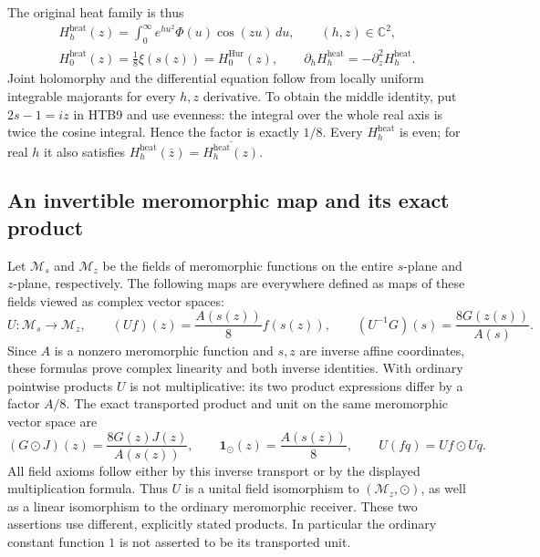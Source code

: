 \documentclass[11pt]{article}
\theoremstyle{definition}
\begin{document}
The original heat family is thus
\begin{equation}\tag{HTB10}
\begin{gathered}
 H_h^{\mathrm{heat}}(z)=\int_0^{\infty}e^{h u^2}\Phi(u)\cos(zu)\,du,
 \qquad (h,z)\in\mathbb C^2,\\
 H_0^{\mathrm{heat}}(z)=\frac18\xi(s(z))=H_0^{\mathrm{Hur}}(z),\qquad
 \partial_h H_h^{\mathrm{heat}}=-\partial_z^2 H_h^{\mathrm{heat}}.
\end{gathered}
\end{equation}
Joint holomorphy and the differential equation follow from locally
uniform integrable majorants for every $h,z$ derivative. To obtain the
middle identity, put $2s-1=iz$ in HTB9 and use evenness: the integral
over the whole real axis is twice the cosine integral. Hence the factor
is exactly $1/8$. Every $H_h^{\mathrm{heat}}$ is even; for real $h$ it
also satisfies $H_h^{\mathrm{heat}}(\bar z)
=\overline{H_h^{\mathrm{heat}}(z)}$.

\subsection{An invertible meromorphic map and its exact product}

Let $\mathcal M_s$ and $\mathcal M_z$ be the fields of meromorphic
functions on the entire $s$-plane and $z$-plane, respectively. The
following maps are everywhere defined as maps of these fields viewed
as complex vector spaces:
\begin{equation}\tag{HTB11}
 U:\mathcal M_s\longrightarrow\mathcal M_z,\qquad
 (Uf)(z)=\frac{A(s(z))}{8}f(s(z)),\qquad
 (U^{-1}G)(s)=\frac{8G(z(s))}{A(s)}.
\end{equation}
Since $A$ is a nonzero meromorphic function and $s,z$ are inverse affine
coordinates, these formulas prove complex linearity and both inverse
identities. With ordinary pointwise products $U$ is not multiplicative:
its two product expressions differ by a factor $A/8$. The exact
transported product and unit on the same meromorphic vector space are
\begin{equation}\tag{HTB12}
 (G\mathbin{\odot}J)(z)=\frac{8G(z)J(z)}{A(s(z))},\qquad
 \mathbf 1_{\odot}(z)=\frac{A(s(z))}{8},\qquad
 U(fq)=Uf\mathbin{\odot}Uq.
\end{equation}
All field axioms follow either by this inverse transport or by the
displayed multiplication formula. Thus $U$ is a unital field
isomorphism to $(\mathcal M_z,\odot)$, as well as a linear isomorphism
to the ordinary meromorphic receiver. These two assertions use
different, explicitly stated products. In particular the ordinary
constant function $1$ is not asserted to be its transported unit.
\end{document}
